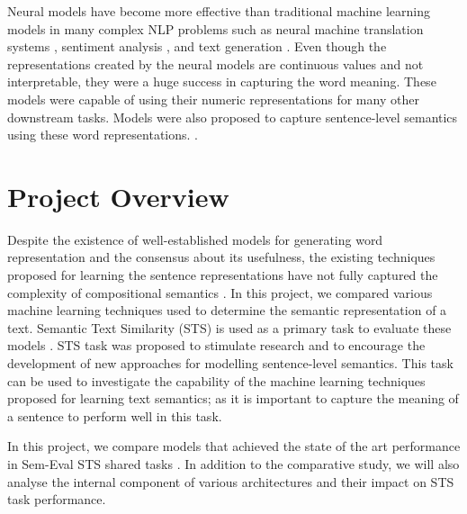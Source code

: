 \documentclass[12pt]{report} %
\begin{document}
	
	Neural models have become more effective than traditional machine learning models in many complex NLP problems such as neural machine translation systems \citep{luong2015effective}, sentiment analysis \citep{socher2011semi}, and text generation \citep{wen2015semantically} . Even though the representations created by the neural models are continuous values and not interpretable, they were a huge success in capturing the word meaning. These models were capable of using their numeric representations for many other downstream tasks. Models were also proposed to capture sentence-level semantics using these word representations.  \citep{kiros2015skip,conneau2017supervised,shao2017hcti}. 
	
	
	
	\section{Project Overview}
	\label{proj_overview}
	Despite the existence of well-established models for generating word representation and the consensus about its usefulness, the existing techniques proposed for learning the sentence representations have not fully captured the complexity of compositional semantics \citep{conneau2017supervised}. In this project, we compared various machine learning techniques used to determine the semantic representation of a text. Semantic Text Similarity (STS) is used as a primary task to evaluate these models  \citep{agirre2012semeval}. STS task was proposed to stimulate research and to encourage the development of new approaches for modelling sentence-level semantics. %
	This task can be used to investigate the capability of the machine learning techniques proposed for learning text semantics; as it is important to capture the meaning of a sentence to perform well in this task.
	
	
	In this project, we compare models that achieved the state of the art performance in Sem-Eval STS shared tasks \citep{cer2017semeval}.  In addition to the comparative study, we will also analyse the internal component of various architectures and their impact on STS task performance.
	
\end{document}
